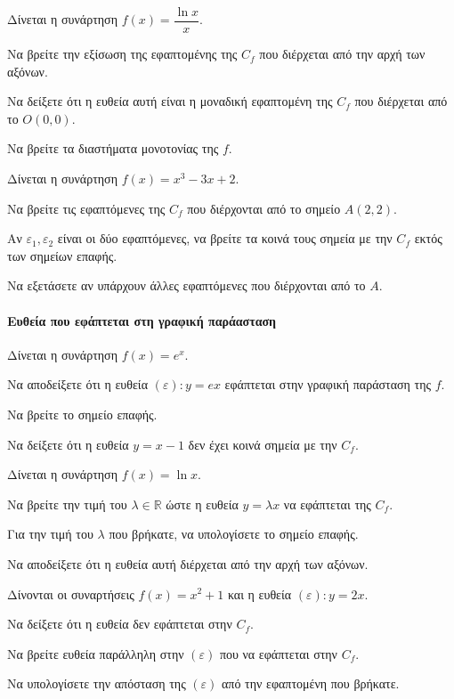 \documentclass[11pt,a4paper,modern]{FFExercises}
\begin{document}
\askhsh
Δίνεται η συνάρτηση $ f(x)=\dfrac{\ln x}{x} $.
\begin{alist}
    \item Να βρείτε την εξίσωση της εφαπτομένης της $ C_f $ που διέρχεται από την αρχή των αξόνων.
    \item Να δείξετε ότι η ευθεία αυτή είναι η μοναδική εφαπτομένη της $ C_f $ που διέρχεται από το $ O(0,0) $.
    \item Να βρείτε τα διαστήματα μονοτονίας της $ f $.
\end{alist}

\askhsh
Δίνεται η συνάρτηση $ f(x)=x^3-3x+2 $.
\begin{alist}
    \item Να βρείτε τις εφαπτόμενες της $ C_f $ που διέρχονται από το σημείο $ A(2,2) $.
    \item Αν $ \varepsilon_1, \varepsilon_2 $ είναι οι δύο εφαπτόμενες, να βρείτε τα κοινά τους σημεία με την $ C_f $ εκτός των σημείων επαφής.
    \item Να εξετάσετε αν υπάρχουν άλλες εφαπτόμενες που διέρχονται από το $ A $.
\end{alist}

\paragraph{Ευθεία που εφάπτεται στη γραφική παράασταση}
\askhsh
Δίνεται η συνάρτηση $ f(x)=e^x $.
\begin{alist}
    \item Να αποδείξετε ότι η ευθεία $ (\varepsilon): y=ex $ εφάπτεται στην γραφική παράσταση της $ f $.
    \item Να βρείτε το σημείο επαφής.
    \item Να δείξετε ότι η ευθεία $ y=x-1 $ δεν έχει κοινά σημεία με την $ C_f $.
\end{alist}

\askhsh
Δίνεται η συνάρτηση $ f(x)=\ln x $.
\begin{alist}
    \item Να βρείτε την τιμή του $ \lambda \in \mathbb{R} $ ώστε η ευθεία $ y=\lambda x $ να εφάπτεται της $ C_f $.
    \item Για την τιμή του $ \lambda $ που βρήκατε, να υπολογίσετε το σημείο επαφής.
    \item Να αποδείξετε ότι η ευθεία αυτή διέρχεται από την αρχή των αξόνων.
\end{alist}

\askhsh
Δίνονται οι συναρτήσεις $ f(x)=x^2+1 $ και η ευθεία $ (\varepsilon): y=2x $.
\begin{alist}
    \item Να δείξετε ότι η ευθεία δεν εφάπτεται στην $ C_f $.
    \item Να βρείτε ευθεία παράλληλη στην $ (\varepsilon) $ που να εφάπτεται στην $ C_f $.
    \item Να υπολογίσετε την απόσταση της $ (\varepsilon) $ από την εφαπτομένη που βρήκατε.
\end{alist}
\end{document}
